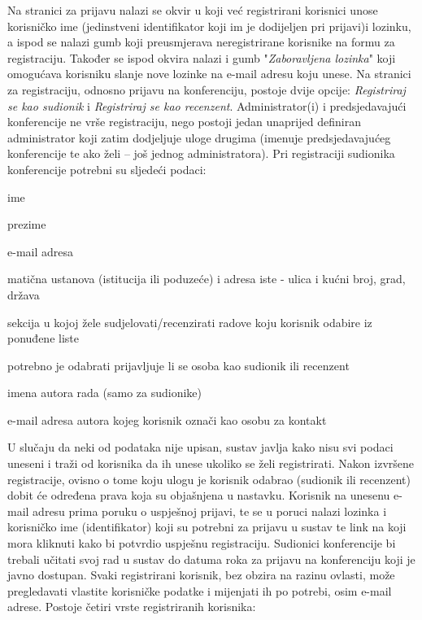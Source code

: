 		\newline
		Na stranici za prijavu nalazi se okvir u koji već registrirani korisnici unose korisničko ime (jedinstveni identifikator koji im je dodijeljen pri prijavi)i lozinku, a ispod se nalazi gumb koji preusmjerava neregistrirane korisnike na formu za registraciju. Također se ispod okvira nalazi i gumb "\textit{Zaboravljena lozinka}" koji omogućava korisniku slanje nove lozinke na e-mail adresu koju unese. Na stranici za registraciju, odnosno prijavu na konferenciju, postoje dvije opcije: \textit{Registriraj se kao sudionik} i \textit{Registriraj se kao recenzent}. Administrator(i) i predsjedavajući konferencije ne vrše registraciju, nego postoji jedan unaprijed definiran administrator koji zatim dodjeljuje uloge drugima (imenuje predsjedavajućeg konferencije te ako želi – još jednog administratora).
		\newline
		\newline
		Pri registraciji sudionika konferencije potrebni su sljedeći podaci:

		\begin{packed_item}

			\item ime
			\item prezime
			\item e-mail adresa
			\item matična ustanova (istitucija ili poduzeće) i adresa iste - ulica i kućni broj, grad, država
			\item sekcija u kojoj žele sudjelovati/recenzirati radove koju korisnik odabire iz ponuđene liste
			\item potrebno je odabrati prijavljuje li se osoba kao sudionik ili recenzent
			\item imena autora rada (samo za sudionike)
			\item e-mail adresa autora kojeg korisnik označi kao osobu za kontakt
		
		\end{packed_item}
	
		U slučaju da neki od podataka nije upisan, sustav javlja kako nisu svi podaci uneseni i traži od korisnika da ih unese ukoliko se želi registrirati. Nakon izvršene registracije, ovisno o tome koju ulogu je korisnik odabrao (sudionik ili recenzent) dobit će određena prava koja su objašnjena u nastavku. Korisnik na unesenu e-mail adresu prima poruku o uspješnoj prijavi, te se u poruci nalazi lozinka i korisničko ime (identifikator) koji su potrebni za prijavu u sustav te link na koji mora kliknuti kako bi potvrdio uspješnu registraciju. Sudionici konferencije bi trebali učitati svoj rad u sustav do datuma roka za prijavu na konferenciju koji je javno dostupan.
		\newline
		\newline
		Svaki registrirani korisnik, bez obzira na razinu ovlasti, može pregledavati vlastite korisničke podatke i mijenjati ih po potrebi, osim e-mail adrese. 
		\newline
		\newline
		Postoje četiri vrste registriranih korisnika:
		
